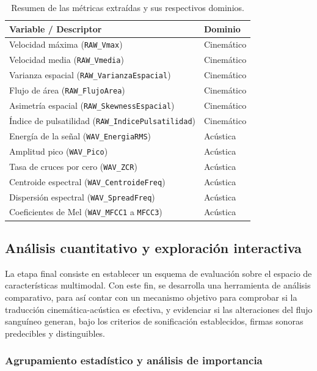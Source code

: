 \begin{table}[htbp]
\centering
\caption{Resumen de las métricas extraídas y sus respectivos dominios.}
\label{tab:resumen_metricas}
\begin{tabular}{ll}
\toprule
\textbf{Variable / Descriptor} & \textbf{Dominio} \\ 
\midrule
Velocidad máxima (\texttt{RAW\_Vmax}) & Cinemático \\
Velocidad media (\texttt{RAW\_Vmedia}) & Cinemático \\
Varianza espacial (\texttt{RAW\_VarianzaEspacial}) & Cinemático \\
Flujo de área (\texttt{RAW\_FlujoArea}) & Cinemático \\
Asimetría espacial (\texttt{RAW\_SkewnessEspacial}) & Cinemático \\
Índice de pulsatilidad (\texttt{RAW\_IndicePulsatilidad}) & Cinemático \\ 
Energía de la señal (\texttt{WAV\_EnergiaRMS}) & Acústica \\
Amplitud pico (\texttt{WAV\_Pico}) & Acústica \\
Tasa de cruces por cero (\texttt{WAV\_ZCR}) & Acústica \\
Centroide espectral (\texttt{WAV\_CentroideFreq}) & Acústica \\
Dispersión espectral (\texttt{WAV\_SpreadFreq}) & Acústica \\
Coeficientes de Mel (\texttt{WAV\_MFCC1} a \texttt{MFCC3}) & Acústica \\ 
\bottomrule
\end{tabular}
\end{table}

\subsection{Análisis cuantitativo y exploración interactiva}

La etapa final consiste en establecer un esquema de evaluación sobre el espacio de características multimodal. Con este fin, se desarrolla una herramienta de análisis comparativo, para así contar con un mecanismo objetivo para comprobar si la traducción cinemática-acústica es efectiva, y evidenciar si las alteraciones del flujo sanguíneo generan, bajo los criterios de sonificación establecidos, firmas sonoras predecibles y distinguibles.

\subsubsection{Agrupamiento estadístico y análisis de importancia}

